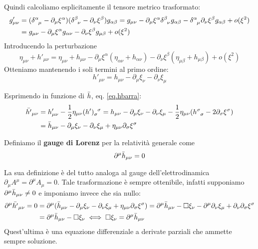 Quindi calcoliamo esplicitamente il tensore metrico trasformato:
\begin{align*}
    g'_{\mu\nu} &= (\tensor{\delta}{^\alpha_\mu} - \partial_\mu \xi^\alpha)(\tensor{\delta}{^\beta_\nu} - \partial_\nu \xi^\beta)g_{\alpha\beta} = g_{\mu\nu} -\partial_\mu\xi^\alpha \tensor{\delta}{^\beta_\nu}g_{\alpha\beta} - \tensor{\delta}{^\alpha_\mu}\partial_\nu \xi^\beta g_{\alpha\beta} +o(\xi^2) \\
    &= g_{\mu\nu} -\partial_\mu \xi^\alpha g_{\alpha\nu} -\partial_\nu \xi^\beta g_{\mu\beta} +o(\xi^2)
\end{align*}
Introducendo la perturbazione
\begin{equation*}
    \eta_{\mu\nu} + h'_{\mu\nu} = \eta_{\mu\nu} + h_{\mu\nu}  -\partial_\mu \xi^\alpha (\eta_{\alpha\nu} +h_{\alpha\nu} )-\partial_\nu \xi^\beta (\eta_{\mu\beta}+ h_{\mu\beta}) +o(\xi^2)
\end{equation*}
Otteniamo mantenendo i soli termini al primo ordine:
\begin{equation}
    h'_{\mu\nu} = h_{\mu\nu} - \partial_\mu \xi_\nu - \partial_\nu \xi_\mu 
    \label{eq.h_perturbato_primoordine}
\end{equation}

Esprimendo in funzione di $\Bar{h}$, eq. \ref{eq.hbarra}:
\begin{align*}
    \Bar{h'}_{\mu\nu} &= h'_{\mu\nu} -\frac{1}{2}\eta_{\mu\nu} \tensor{(h')}{_\sigma^\sigma} = h_{\mu\nu} -\partial_\mu \xi_\nu - \partial_\nu \xi_\mu - \frac{1}{2}\eta_{\mu\nu}(\tensor{h}{^\sigma_\sigma} - 2\partial_\sigma \xi^\sigma ) \\
    &= \Bar{h}_{\mu\nu} -\partial_\mu \xi_\nu - \partial_\nu \xi_\mu +\eta_{\mu\nu} \partial_\sigma \xi^\sigma
\end{align*}

\begin{definizione}
Definiamo il \textbf{gauge di Lorenz} per la relatività generale come
\begin{equation}
    \partial^\mu \Bar{h}_{\mu\nu} = 0
    \label{eq.gaugelorenzgr}
\end{equation}
\end{definizione}
La sua definizione è del tutto analoga al gauge dell'elettrodinamica $\partial_\mu A^\mu = \partial^\mu A_\mu = 0$.
Tale trasformazione è sempre ottenibile, infatti supponiamo $\partial^\mu \Bar{h}_{\mu\nu} \neq 0$ e imponiamo invece che sia nullo:
\begin{align*}
    \partial^\mu \Bar{h'}_{\mu\nu} = 0 &= \partial^\mu (\Bar{h}_{\mu\nu} - \partial_\mu \xi_\nu - \partial_\nu \xi_\mu + \eta_{\mu\nu} \partial_\sigma \xi^\sigma )
    =\partial^\mu \Bar{h}_{\mu\nu} - \square\xi_\nu - \partial^\mu\partial_\nu \xi_\mu + \partial_\nu \partial_\sigma\xi^\sigma \\
    &= \partial^\mu \Bar{h}_{\mu\nu} - \square\xi_\nu \iff \square \xi_\nu = \partial^\mu \Bar{h}_{\mu\nu}
\end{align*}
Quest'ultima è una equazione differenziale a derivate parziali che ammette sempre soluzione.

